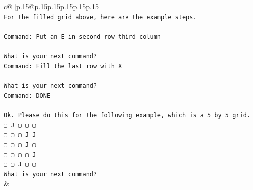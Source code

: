 \documentclass{article}
\begin{document}
{\begin{supertabular}{c@{$\;$}|p{.15\linewidth}@{}p{.15\linewidth}p{.15\linewidth}p{.15\linewidth}p{.15\linewidth}p{.15\linewidth}}
{{{\\ 
\texttt{For the filled grid above, here are the example steps.} \\
\\ 
\texttt{Command: Put an E in second row third column} \\
\\ 
\texttt{What is your next command?} \\
\texttt{Command: Fill the last row with X} \\
\\ 
\texttt{What is your next command?} \\
\texttt{Command: DONE} \\
\\ 
\texttt{Ok. Please do this for the following example, which is a 5 by 5 grid.} \\
\texttt{▢ J ▢ ▢ ▢} \\
\texttt{▢ ▢ ▢ J J} \\
\texttt{▢ ▢ ▢ J ▢} \\
\texttt{▢ ▢ ▢ ▢ J} \\
\texttt{▢ ▢ J ▢ ▢} \\
\texttt{What is your next command?} \\
            }
        }
    }
    & \\ \\


\end{supertabular}}
\end{document}
